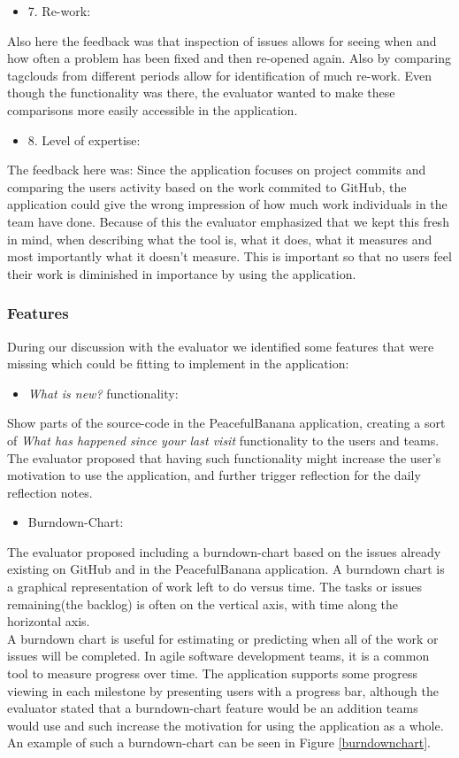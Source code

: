 \begin{itemize}
    \item 7. Re-work: 
\end{itemize}
 Also here the feedback was that inspection of issues allows for seeing when and how often a problem has been fixed and then re-opened again. Also by comparing tagclouds from different periods allow for identification of much re-work. Even though the functionality was there, the evaluator wanted to make these comparisons more easily accessible in the application.

\begin{itemize}
    \item 8. Level of expertise:   
\end{itemize}
The feedback here was: Since the application focuses on project commits and comparing the users activity based on the work commited to GitHub, the application could give the wrong impression of how much work individuals in the team have done. Because of this the evaluator emphasized that we kept this fresh in mind, when describing what the tool is, what it does, what it measures and most importantly what it doesn't measure. This is important so that no users feel their work is diminished in importance by using the application.

\subsubsection{Features}
During our discussion with the evaluator we identified some features that were missing which could be fitting to implement in the application:
\begin{itemize}
	\item \emph{What is new?} functionality:
\end{itemize}
Show parts of the source-code in the PeacefulBanana application, creating a sort of \emph{What has happened since your last visit} functionality to the users and teams. The evaluator proposed that having such functionality might increase the user's motivation to use the application, and further trigger reflection for the daily reflection notes. 
\begin{itemize}
	\item Burndown-Chart:
\end{itemize}
The evaluator proposed including a burndown-chart based on the issues already existing on GitHub and in the PeacefulBanana application. A burndown chart is a graphical representation of work left to do versus time. The tasks or issues remaining(the backlog) is often on the vertical axis, with time along the horizontal axis.\\
A burndown chart is useful for estimating or predicting when all of the work or issues will be completed. In agile software development teams, it is a common tool to measure progress over time. The application supports some progress viewing in each milestone by presenting users with a progress bar, although the evaluator stated that a burndown-chart feature would be an addition teams would use and such increase the motivation for using the application as a whole. An example of such a burndown-chart can be seen in Figure \ref{burndownchart}. \\

